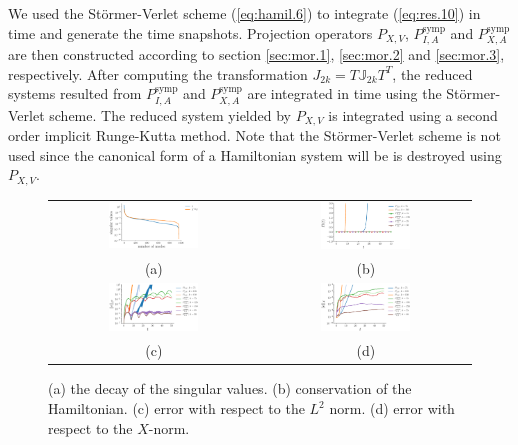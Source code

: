 We used the St\"ormer-Verlet scheme (\ref{eq:hamil.6}) to integrate (\ref{eq:res.10}) in time and generate the time snapshots. Projection operators $P_{X,V}$, $P^{\text{symp}}_{I,A}$ and $P^{\text{symp}}_{X,A}$  are then constructed according to section {\ref{sec:mor.1}}, {\ref{sec:mor.2}} and {\ref{sec:mor.3}}, respectively. After computing the transformation $J_{2k} = T \mathbb J_{2k} T^T$, the reduced systems resulted from $P^{\text{symp}}_{I,A}$ and $P^{\text{symp}}_{X,A}$ are integrated in time using the St\"ormer-Verlet scheme. The reduced system yielded by $P_{X,V}$ is integrated using a second order implicit Runge-Kutta method. Note that the St\"ormer-Verlet scheme is not used since the canonical form of a Hamiltonian system will be is destroyed using $P_{X,V}$.

\begin{figure} \label{fig:1}
\begin{tabular}{cc}
\includegraphics[width=0.45\textwidth]{./figs/beam/singulars} & \includegraphics[width=0.45\textwidth]{./figs/beam/energy} \\
(a) & (b) \\
\includegraphics[width=0.45\textwidth]{./figs/beam/l2_norm} & \includegraphics[width=0.45\textwidth]{./figs/beam/energy_norm} \\
(c) & (d) \\
\end{tabular}
\caption{(a) the decay of the singular values. (b) conservation of the Hamiltonian. (c) error with respect to the $L^2$ norm. (d) error with respect to the $X$-norm.}
\end{figure}

